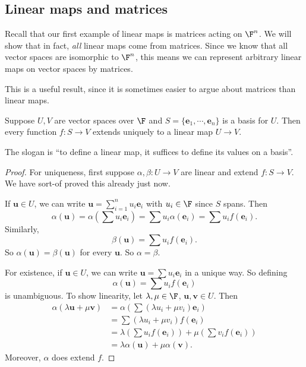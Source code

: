 \documentclass[a4paper]{article}
\begin{document}
\subsection{Linear maps and matrices}
Recall that our first example of linear maps is matrices acting on $\F^n$. We will show that in fact, \emph{all} linear maps come from matrices. Since we know that all vector spaces are isomorphic to $\F^n$, this means we can represent arbitrary linear maps on vector spaces by matrices.

This is a useful result, since it is sometimes easier to argue about matrices than linear maps.

\begin{prop}
  Suppose $U, V$ are vector spaces over $\F$ and $S = \{\mathbf{e}_1, \cdots, \mathbf{e}_n\}$ is a basis for $U$. Then every function $f: S \to V$ extends uniquely to a linear map $U \to V$.
\end{prop}
The slogan is ``to define a linear map, it suffices to define its values on a basis''.

\begin{proof}
  For uniqueness, first suppose $\alpha, \beta: U \to V$ are linear and extend $f: S \to V$. We have sort-of proved this already just now.

  If $\mathbf{u}\in U$, we can write $\mathbf{u} = \sum_{i = 1}^n u_i \mathbf{e}_i$ with $u_i \in \F$ since $S$ spans. Then
  \[
    \alpha (\mathbf{u}) = \alpha\left(\sum u_i \mathbf{e}_i\right) = \sum u_i \alpha (\mathbf{e}_i) = \sum u_i f( \mathbf{e}_i).
  \]
  Similarly,
  \[
    \beta( \mathbf{u}) = \sum u_i f(\mathbf{e}_i).
  \]
  So $\alpha (\mathbf{u}) = \beta(\mathbf{u})$ for every $\mathbf{u}$. So $\alpha = \beta$.

  For existence, if $\mathbf{u} \in U$, we can write $\mathbf{u} = \sum u_i \mathbf{e}_i$ in a unique way. So defining
  \[
    \alpha(\mathbf{u}) = \sum u_i f(\mathbf{e}_i)
  \]
  is unambiguous. To show linearity, let $\lambda, \mu\in \F$, $\mathbf{u}, \mathbf{v}\in U$. Then
  \begin{align*}
    \alpha (\lambda \mathbf{u} + \mu \mathbf{v}) &= \alpha \left(\sum (\lambda u_i + \mu v_i) \mathbf{e}_i\right) \\
    &= \sum (\lambda u_i + \mu v_i) f(\mathbf{e}_i)\\
    &= \lambda \left(\sum u_i f(\mathbf{e}_i)\right) + \mu \left(\sum v_i f(\mathbf{e}_i)\right)\\
    &= \lambda \alpha(\mathbf{u}) + \mu \alpha(\mathbf{v}).
  \end{align*}
  Moreover, $\alpha$ does extend $f$.
\end{proof}
\end{document}
